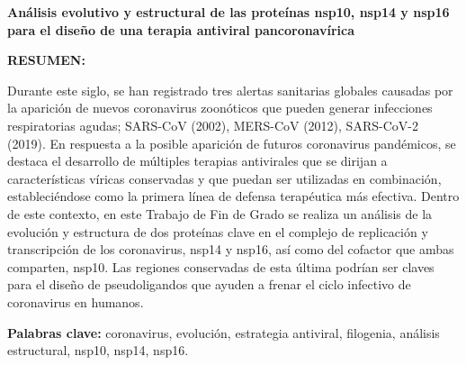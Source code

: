 \begin{center}
    \Large\bfseries Análisis evolutivo y estructural de las proteínas nsp10, 
    nsp14 y nsp16 para el diseño de una terapia antiviral pancoronavírica

\end{center} 

\vspace{0.5cm}

    \textbf {RESUMEN:} 

    Durante este siglo, se han registrado tres alertas sanitarias globales 
    causadas por la aparición de nuevos coronavirus zoonóticos que pueden 
    generar infecciones respiratorias agudas; SARS-CoV (2002), MERS-CoV (2012), 
    SARS-CoV-2 (2019). En respuesta a la posible aparición de futuros 
    coronavirus pandémicos, se destaca el desarrollo de múltiples terapias 
    antivirales que se dirijan a características víricas conservadas y que 
    puedan ser utilizadas en combinación, estableciéndose como la primera línea 
    de defensa terapéutica más efectiva. Dentro de este contexto, en este 
    Trabajo de Fin de Grado se realiza un análisis de la evolución y estructura 
    de dos proteínas clave en el complejo de replicación y transcripción de los 
    coronavirus, nsp14 y nsp16, así como del cofactor que ambas comparten, 
    nsp10. Las regiones conservadas de esta última podrían ser claves para el 
    diseño de pseudoligandos que ayuden a frenar el ciclo infectivo de 
    coronavirus en humanos.

\vspace{0.5cm}

    \textbf{Palabras clave:} coronavirus, evolución, estrategia antiviral, 
    filogenia, análisis estructural, nsp10, nsp14, nsp16.